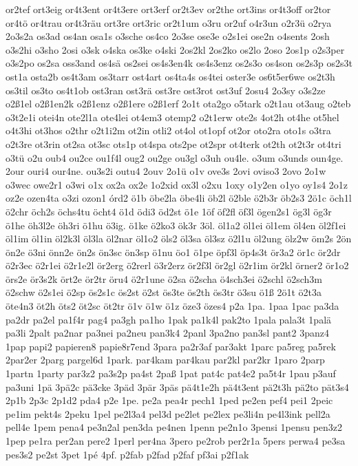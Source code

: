 {or2tef
ort3eig
or4t3ent
or4t3ere
ort3erf
or2t3ev
or2the
ort3ins
or4t3off
or2tor
or4tö
or4trau
or4t3räu
ort3re
ort3ric
or2t1um
o3ru
or2uf
o4r3un
o2r3ü
o2rya
2o3s2a
os3ad
os4an
osa1s
o3sche
os4co
2o3se
ose3e
o2s1ei
ose2n
o4sents
2osh
o3s2hi
o3sho
2osi
o3sk
o4ska
os3ke
o4ski
2os2kl
2os2ko
os2lo
2oso
2os1p
o2s3per
o3s2po
os2sa
oss3and
os4sä
os2sei
os4s3en4k
os4s3enz
os2s3o
os4son
os2s3p
os2s3t
ost1a
osta2b
os4t3am
os3tarr
ost4art
os4ta4s
os4tei
oster3e
os6t5er6we
os2t3h
os3til
os3to
os4t1ob
ost3ran
ost3rä
ost3re
ost3rot
ost3uf
2osu4
2o3sy
o3s2ze
o2ß1el
o2ß1en2k
o2ß1enz
o2ß1ere
o2ß1erf
2o1t
ota2go
o5tark
o2t1au
ot3aug
o2teb
o3t2e1i
otei4n
ote2l1a
ote4lei
ot4em3
otemp2
o2t1erw
ote2s
4ot2h
ot4he
ot5hel
o4t3hi
ot3hos
o2thr
o2t1i2m
ot2in
otli2
ot4ol
ot1opf
ot2or
oto2ra
oto1s
o3tra
o2t3re
ot3rin
ot2sa
ot3sc
ots1p
ot4spa
ots2pe
ot2spr
ot4terk
ot2th
ot2t3r
ot4tri
o3tü
o2u
oub4
ou2ce
ou1f4l
oug2
ou2ge
ou3gl
o3uh
ou4le.
o3um
o3unds
oun4ge.
2our
ouri4
our4ne.
ou3s2i
outu4
2ouv
2o1ü
o1v
ove3s
2ovi
oviso3
2ovo
2o1w
o3wec
owe2r1
o3wi
o1x
ox2a
ox2e
1o2xid
ox3l
o2xu
1oxy
o1y2en
o1yo
oy1s4
2o1z
oz2e
ozen4ta
o3zi
ozon1
órd2
ö1b
öbe2la
öbe4li
öb2l
ö2ble
ö2b3r
öb2s3
2ö1c
öch1l
ö2chr
öch2s
öchs4tu
öcht4
ö1d
ödi3
öd2st
ö1e
1öf
öf2fl
öf3l
ögen2s1
ög3l
ög3r
ö1he
öh3l2e
öh3ri
ö1hu
ö3ig.
ö1ke
ö2ko3
ök3r
3öl.
öl1a2
öl1ei
öl1em
öl4en
öl2f1ei
öl1im
öl1in
öl2k3l
öl3la
öl2nar
öl1o2
öls2
öl3sa
öl3sz
ö2l1u
öl2ung
ölz2w
öm2s
2ön
ön2e
ö3ni
önn2e
ön2s
ön3sc
ön3sp
ö1nu
öo1
ö1pe
öpf3l
öp4s3t
ör3a2
ör1c
ör2dr
ö2r3ec
ö2r1ei
ö2r1e2l
ör2erg
ö2rerl
ö3r2erz
ör2f3l
ör2gl
ö2r1im
ör2kl
örner2
ör1o2
örs2e
ör3s2k
ört2e
ör2tr
öru4
ö2r1une
ö2sa
ö2scha
ö4sch3ei
ö2schl
ö2sch3m
ö2schw
ö2s1ei
ö2sp
ös2s1c
ös2st
ö2st
ös3te
ös2th
ös3tr
ö3su
ö1ß
2ö1t
ö2t3a
öte4n3
öt2h
öts2
öt2sc
öt2tr
ö1v
ö1w
ö1z
öze3
özes4
p2a
1pa.
1paa
1pac
pa3da
pa2dr
pa2el
pa1f4r
pag4
pa3gh
pa1ho
1pak
pa1k4l
pak2to
1pala
pala3t
1palä
pa3li
2palt
pa2nar
pa3nei
pa2neu
pan3k4
2panl
3pa2no
pan3sl
pant2
3panz4
1pap
papi2
papieren8
papie8r7end
3para
pa2r3af
par3akt
1parc
pa5reg
pa5rek
2par2er
2parg
pargel6d
1park.
par4kam
par4kau
par2kl
par2kr
1paro
2parp
1partn
1party
par3z2
pa3s2p
pa4st
2paß
1pat
pat4c
pat4e2
pa5t4r
1pau
p3auf
pa3uni
1pä
3pä2c
pä3cke
3päd
3pär
3päs
pä4t1e2h
pä4t3ent
pä2t3h
pä2to
pät3s4
2p1b
2p3c
2p1d2
pda4
p2e
1pe.
pe2a
pea4r
pech1
1ped
pe2en
pef4
pei1
2peic
pe1im
pekt4s
2peku
1pel
pe2l3a4
pel3d
pe2let
pe2lex
pe3li4n
pe4l3ink
pell2a
pell4e
1pem
pena4
pe3n2al
pen3da
pe4nen
1penn
pe2n1o
3pensi
1pensu
pen3z2
1pep
pe1ra
per2an
pere2
1perl
per4na
3pero
pe2rob
per2r1a
5pers
perwa4
pe3sa
pes3s2
pe2st
3pet
1pé
4pf.
p2fab
p2fad
p2faf
pf3ai
p2f1ak
}
